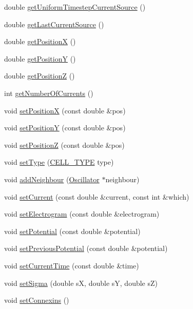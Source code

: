 \begin{DoxyCompactItemize}
\item 
double \hyperlink{class_oscillator_a38ec1c04097cceea46f4712fca7169e2}{get\+Uniform\+Timestep\+Current\+Source} ()
\item 
double \hyperlink{class_oscillator_ae0af6d579f485bc7ffbff790c145b388}{get\+Last\+Current\+Source} ()
\item 
double \hyperlink{class_oscillator_ad2be11901d2b0055a48890643db3350d}{get\+Position\+X} ()
\item 
double \hyperlink{class_oscillator_aaa999e4824d4e4007c0541ae78f60e6c}{get\+Position\+Y} ()
\item 
double \hyperlink{class_oscillator_a6f21f66ca4ca7a163d6b3d84eda3b8db}{get\+Position\+Z} ()
\item 
int \hyperlink{class_oscillator_a115350abaf2f6ddbf9c06027b8faa1e6}{get\+Number\+Of\+Currents} ()
\item 
void \hyperlink{class_oscillator_a672b578b643936b3b0b42371b6d339d9}{set\+Position\+X} (const double \&pos)
\item 
void \hyperlink{class_oscillator_aecfc7c140beecd6a82ab6d414892632d}{set\+Position\+Y} (const double \&pos)
\item 
void \hyperlink{class_oscillator_a597c5025182c90571804c6dc81f33e70}{set\+Position\+Z} (const double \&pos)
\item 
void \hyperlink{class_oscillator_acdee83b452a76ee20b48248cd4ba45cc}{set\+Type} (\hyperlink{heart_defines_8h_a2f059cd81f362503874790462d535f5b}{C\+E\+L\+L\+\_\+\+T\+Y\+P\+E} type)
\item 
void \hyperlink{class_oscillator_af5cd9a1f69c6e31748d54128a68628f8}{add\+Neighbour} (\hyperlink{class_oscillator}{Oscillator} $\ast$neighbour)
\item 
void \hyperlink{class_oscillator_a5e4ecacba9fc577660c1643c1e50e0bb}{set\+Current} (const double \&current, const int \&which)
\item 
void \hyperlink{class_oscillator_a42171f7e11ac041ab982d055ba389352}{set\+Electrogram} (const double \&electrogram)
\item 
void \hyperlink{class_oscillator_a91b56c7ed7c11f30109e8b1db296b2a6}{set\+Potential} (const double \&potential)
\item 
void \hyperlink{class_oscillator_a3e24a7637ed5aaf05101f3e115ea8e9c}{set\+Previous\+Potential} (const double \&potential)
\item 
void \hyperlink{class_oscillator_ae4fdf768b4fc00f6830c295cdc2f3e62}{set\+Current\+Time} (const double \&time)
\item 
void \hyperlink{class_oscillator_a549fcc8c0dc9a0789a062a0b1062610b}{set\+Sigma} (double s\+X, double s\+Y, double s\+Z)
\item 
void \hyperlink{class_oscillator_a8d4b8d2c8eb200afbbb4d4d999f068ab}{set\+Connexins} ()
\end{DoxyCompactItemize}
